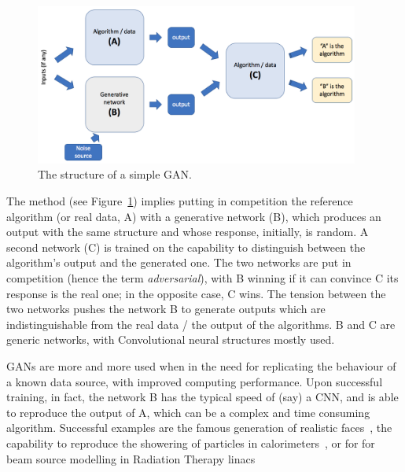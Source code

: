 \begin{figure}[h]
     \centering
     \includegraphics[width=0.95\textwidth]{images/gan.png}
     \caption{The structure of a simple GAN.}
     \label{fig:gan}
 \end{figure}

The method (see Figure~\ref{fig:gan}) implies putting in competition the reference algorithm (or real data, A) with a generative network (B), which produces an output with the same structure and whose response, initially, is random. A second network (C) is trained on the capability to distinguish between the algorithm's output and the generated one. The two networks are put in competition (hence the term \emph{adversarial}), with B winning if it can convince C its response is the real one; in the opposite case, C wins.
The tension between the two networks pushes the network B to generate outputs which are indistinguishable from the real data / the output of the  algorithms. B and C are generic networks, with Convolutional neural structures mostly used.

GANs are more and more used when in the need for replicating the behaviour of a known data source, with improved computing performance. Upon successful training, in fact, the network B has the typical speed of (say) a CNN, and is able to reproduce the output of A, which can be a complex and time consuming algorithm. Successful examples are the famous generation of realistic faces~\cite{faces}, the capability to reproduce the showering of particles in calorimeters~\cite{calogan}, or for 
for beam source modelling in Radiation Therapy linacs~\cite{Sarrut2019}


